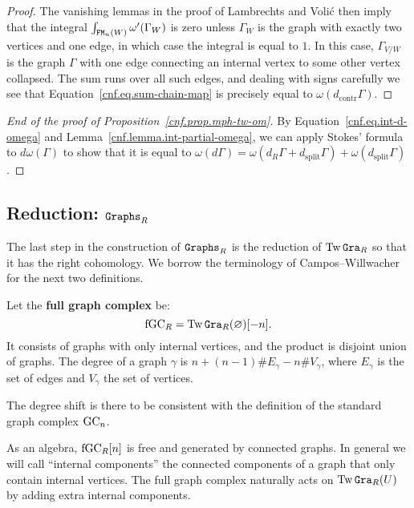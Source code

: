 \begin{proof}
  The vanishing lemmas in the proof of Lambrechts and Volić then imply that the integral $\int_{\mathtt{FM}_{n}(W)} \omega'(\Gamma_{W})$ is zero unless $\Gamma_{W}$ is the graph with exactly two vertices and one edge, in which case the integral is equal to $1$.
  In this case, $\Gamma_{V/W}$ is the graph $\Gamma$ with one edge connecting an internal vertex to some other vertex collapsed.
  The sum runs over all such edges, and dealing with signs carefully we see that Equation~\eqref{cnf.eq.sum-chain-map} is precisely equal to $\omega(d_{\mathrm{contr}} \Gamma)$.
\end{proof}

\begin{proof}[End of the proof of Proposition~\ref{cnf.prop.mph-tw-om}]
  By Equation~\eqref{cnf.eq.int-d-omega} and Lemma~\ref{cnf.lemma.int-partial-omega}, we can apply Stokes' formula to $d \omega(\Gamma)$ to show that it is equal to $\omega(d \Gamma) = \omega(d_{R} \Gamma + d_{\mathrm{split}} \Gamma) + \omega(d_{\mathrm{split}} \Gamma)$.
\end{proof}

\subsection{Reduction: \texorpdfstring{$\mathtt{Graphs}_R$}{Graphs\_R}}
\label{cnf.sec.reduct-graphs_r}

The last step in the construction of $\mathtt{Graphs}_{R}$ is the reduction of $\operatorname{Tw}\mathtt{Gra}_{R}$ so that it has the right cohomology.
We borrow the terminology of Campos--Willwacher~\cite{CamposWillwacher2016} for the next two definitions.

\begin{definition}
  Let the \textbf{full graph complex} be:
  \[ \mathrm{fGC}_{R} = \operatorname{Tw}\mathtt{Gra}_{R}(\varnothing)[-n]. \]
  It consists of graphs with only internal vertices, and the product is disjoint union of graphs.
  The degree of a graph $\gamma$ is $n + (n-1) \#E_{\gamma} - n \#V_{\gamma}$, where $E_{\gamma}$ is the set of edges and $V_{\gamma}$ the set of vertices.
\end{definition}

\begin{remark}
  The degree shift is there to be consistent with the definition of the standard graph complex $\mathrm{GC}_{n}$.
\end{remark}

As an algebra, $\mathrm{fGC}_{R}[n]$ is free and generated by connected graphs.
In general we will call ``internal components'' the connected components of a graph that only contain internal vertices.
The full graph complex naturally acts on $\operatorname{Tw}\mathtt{Gra}_{R}(U)$ by adding extra internal components.

